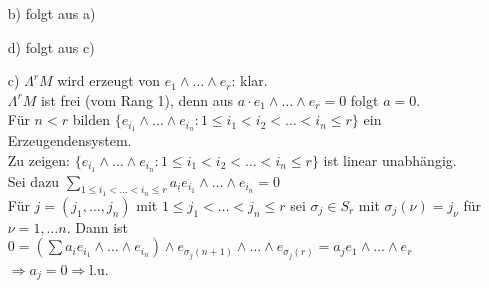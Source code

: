  \begin{Bew}
  \begin{enumerate}
   \item[ b) ] folgt aus a)
   \item[ d) ] folgt aus c)
   \item[ c) ] $\Lambda^rM$ wird erzeugt von $e_1 \wedge \dots \wedge e_r$: klar.\\
 $\Lambda^rM$ ist frei (vom Rang 1), denn aus $a \cdot e_1 \wedge \dots \wedge e_r = 0$ folgt $a=0$. \\
    Für $n<r$ bilden  $\{e_{i_1} \wedge \dots \wedge e_{i_n}: 1 \leq i_1 < i_2 < \dots < i_n \leq r \}$
    ein Erzeugendensystem. \\
    Zu zeigen: $\{e_{i_1} \wedge \dots \wedge e_{i_n}: 1 \leq i_1 < i_2 < \dots < i_n \leq r \}$ ist linear unabh\"angig.\\
 Sei dazu $\sum_{1 \leq i_1 < \dots < i_n \leq r} a_{\underline{i}}e_{i_1} \wedge \dots \wedge e_{i_n} = 0$\\
    F\"ur $j = (j_1, \dots, j_n)$ mit $1 \leq j_1 < \dots < j_n \leq r$ sei $\sigma_j \in S_r$ mit 
    $\sigma_j(\nu) = j_{\nu}$ für $\nu = 1, \dots n$. Dann ist $ 0= (\sum a_i e_{i_1} \wedge \dots \wedge e_{i_n}) \wedge 
    e_{\sigma_j(n+1)}  \wedge \dots \wedge e_{\sigma_j(r) } = a_j e_1 \wedge \dots \wedge e_r$ $\Rightarrow a_j = 0 \Rightarrow $l.u. 
  \end{enumerate}
 \end{Bew}
